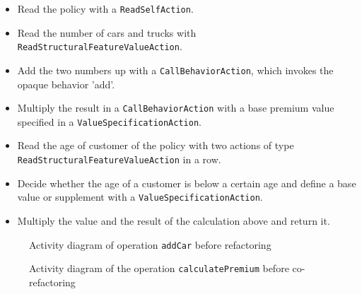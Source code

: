 \documentclass{llncs}
\begin{document}
\begin{itemize}
 \item Read the policy with a \texttt{Read\-Self\-Action}.
 \item Read the number of cars and trucks with \texttt{Read\-Structural\-Feature\-Value\-Action}.
 \item Add the two numbers up with a \texttt{Call\-Behavior\-Action}, which invokes the opaque behavior 'add'.
 \item Multiply the result in a \texttt{Call\-Behavior\-Action} with a base premium value specified in a \texttt{Value\-Specification\-Action}.
 \item Read the age of customer of the policy with two actions of type \texttt{Read\-Structural\-Feature\-Value\-Action} in a row.
 \item Decide whether the age of a customer is below a certain age and define a base value or supplement with a \texttt{Value\-Specification\-Action}.
 \item Multiply the value and the result of the calculation above and return it.
\end{itemize}

\begin{figure}[h!t]
 \centering
{}
 \caption{Activity diagram of operation \texttt{addCar} before refactoring}
 \label{fig:addCar}
\end{figure}

\begin{figure}[h!t]
 \centering
{}
 \caption{Activity diagram of the operation \texttt{calculatePremium} before co-refactoring}
 \label{fig:calculatePremium}
\end{figure}
\end{document}
